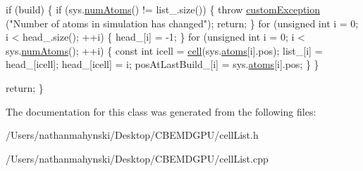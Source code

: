 \begin{DoxyCode}
    \textcolor{keywordflow}{if} (build) \{
        \textcolor{keywordflow}{if} (sys.\hyperlink{classsystem_definition_ae8d3c2df2d56241cee03fcc4e2026ae0}{numAtoms}() != list\_.size()) \{
            \textcolor{keywordflow}{throw} \hyperlink{classcustom_exception}{customException} (\textcolor{stringliteral}{"Number of atoms in
       simulation has changed"});
            \textcolor{keywordflow}{return};
        \}
        \textcolor{keywordflow}{for} (\textcolor{keywordtype}{unsigned} \textcolor{keywordtype}{int} i = 0; i < head\_.size(); ++i) \{
            head\_[i] = -1;
        \}
        \textcolor{keywordflow}{for} (\textcolor{keywordtype}{unsigned} \textcolor{keywordtype}{int} i = 0; i < sys.\hyperlink{classsystem_definition_ae8d3c2df2d56241cee03fcc4e2026ae0}{numAtoms}(); ++i) \{
            \textcolor{keyword}{const} \textcolor{keywordtype}{int} icell = \hyperlink{classcell_list__cpu_a564d95c9bd7af0829291789d173361e0}{cell}(sys.\hyperlink{classsystem_definition_ae8814d3f60fc1111af2a3f218a4bfcab}{atoms}[i].pos);
            list\_[i] = head\_[icell];
            head\_[icell] = i;
            posAtLastBuild\_[i] = sys.\hyperlink{classsystem_definition_ae8814d3f60fc1111af2a3f218a4bfcab}{atoms}[i].pos;
        \}
    \} 

    \textcolor{keywordflow}{return};
\}
\end{DoxyCode}


The documentation for this class was generated from the following files\-:\begin{DoxyCompactItemize}
\item 
/\-Users/nathanmahynski/\-Desktop/\-C\-B\-E\-M\-D\-G\-P\-U/cell\-List.\-h\item 
/\-Users/nathanmahynski/\-Desktop/\-C\-B\-E\-M\-D\-G\-P\-U/cell\-List.\-cpp\end{DoxyCompactItemize}
